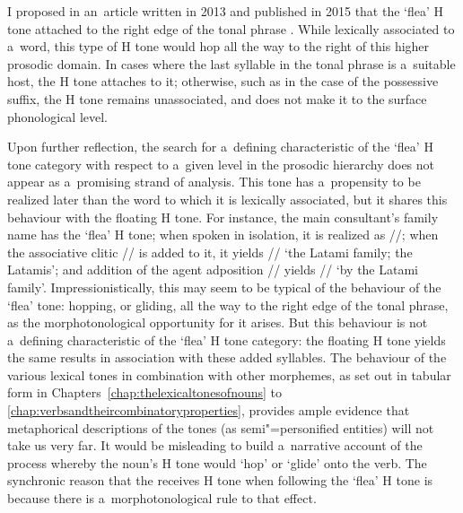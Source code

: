I proposed in an~article written in 2013 and published in 2015 that the ‘flea’ H tone attached to the right edge of the tonal phrase \citep{michaud2015b}. While lexically associated to a~word, this type of H tone would hop all the way to the right of this higher prosodic domain. In cases where the last syllable in the tonal phrase is a~suitable host, the H tone attaches to it; otherwise, such as in the case of the {possessive} suffix, the H tone remains unassociated, and does not make it to the surface phonological level. 

Upon further reflection, the search for a~defining characteristic of the ‘flea’ H tone category with respect to a~given level in the prosodic hierarchy does not appear as a~promising strand of analysis. This tone has a~propensity to be realized later than the word to which it is lexically associated, but it shares this behaviour with the floating H tone. For instance, the main consultant’s family name has the ‘flea’ H tone; when spoken in isolation, it is realized as //; when the {associative} clitic // is added to it, it yields // ‘the Latami family; the Latamis’; and addition of the {agent} adposition // yields // ‘by the
Latami family’. Impressionistically, this may seem to be typical of the behaviour of the ‘flea’ tone: hopping, or gliding, all the way to the right edge of the tonal phrase, as the morphotonological opportunity for it arises. But this behaviour is not a~defining characteristic of the ‘flea’ H tone category: the floating H tone yields the same results in association with these added syllables. The behaviour of the various lexical tones in combination with other morphemes, as set out in tabular form in Chapters~\ref{chap:thelexicaltonesofnouns} to \ref{chap:verbsandtheircombinatoryproperties}, provides ample evidence that metaphorical descriptions of the tones (as semi"=personified entities) will not take us very far. It would be misleading to build a~narrative account of the process whereby the noun's H tone would ‘hop’ or ‘glide’ onto the verb. The synchronic reason that the  receives H tone when following the ‘flea’ H tone is because there is a~morphotonological rule to that effect. 

